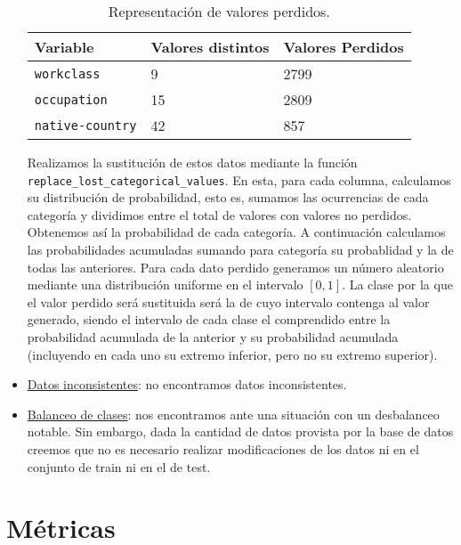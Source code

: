 \documentclass[11pt,a4paper]{article}
\begin{document}
\begin{itemize}
\begin{table}[h]
\begin{center}
\begin{tabular}{|l|ll|}
\hline
Variable& Valores distintos & Valores Perdidos\\ \hline
\texttt{workclass} & 9 & 2799\\
\texttt{occupation} & 15 & 2809\\
\texttt{native-country} & 42 & 857\\\hline
\end{tabular}
\end{center}
\caption{Representación de valores perdidos.}
	\end{table}
	
	Realizamos la sustitución de estos datos mediante la función \texttt{replace\_lost\_categorical\_values}. En esta, para cada columna, calculamos su distribución de probabilidad, esto es, sumamos las ocurrencias de cada categoría y dividimos entre el total de valores con valores no perdidos. Obtenemos así la probabilidad de cada categoría. A continuación calculamos las probabilidades acumuladas sumando para categoría su probablidad y la de todas las anteriores. Para cada dato perdido generamos un número aleatorio mediante una distribución uniforme en el intervalo $[0,1]$. La clase por la que el valor perdido será sustituida será la de cuyo intervalo contenga al valor generado, siendo el intervalo de cada clase el comprendido entre la probabilidad acumulada de la anterior y su probabilidad acumulada (incluyendo en cada uno su extremo inferior, pero no su extremo superior).
	
	\item \underline{Datos inconsistentes}: no encontramos datos inconsistentes.
	\item \underline{Balanceo de clases}: nos encontramos ante una situación con un desbalanceo notable. Sin embargo, dada la cantidad de datos provista por la base de datos creemos que no es necesario realizar modificaciones de los datos ni en el conjunto de train ni en el de test.
\end{itemize}




\section{ Métricas }
\end{document}
